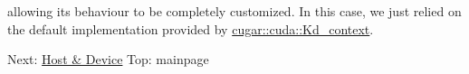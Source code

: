 \begin{DoxyParagraph}{}
allowing its behaviour to be completely customized. In this case, we just relied on the default implementation provided by \hyperlink{structcugar_1_1cuda_1_1_kd__context}{cugar\+::cuda\+::\+Kd\+\_\+context}.
\end{DoxyParagraph}
Next\+: \hyperlink{host_device_page}{Host \& Device} Top\+: mainpage 